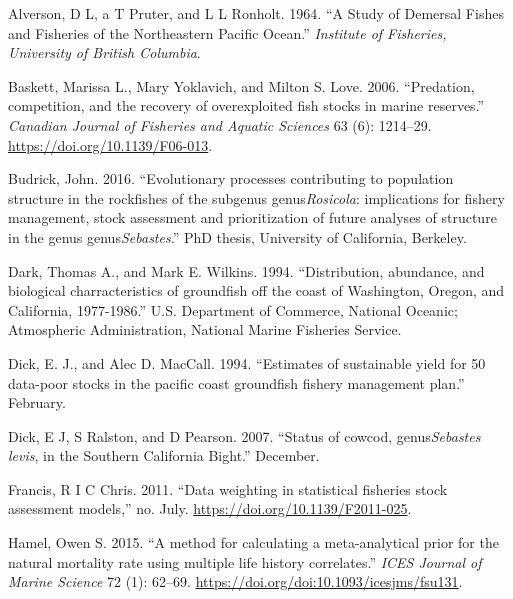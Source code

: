 \documentclass[11pt,
  english,
  a4paper,
]{article}
\newlength{\cslhangindent}
\newenvironment{CSLReferences}[2] %
 {%
  \setlength{\parindent}{0pt}
  \ifodd #1 \everypar{\setlength{\hangindent}{\cslhangindent}}\ignorespaces\fi
  \ifnum #2 > 0
  \setlength{\parskip}{#2\baselineskip}
  \fi
 }%
 {}
\begin{document}
\hypertarget{refs}{}
\begin{CSLReferences}{1}{0}
\leavevmode{}%
Alverson, D L, a T Pruter, and L L Ronholt. 1964. {``{A Study of Demersal Fishes and Fisheries of the Northeastern Pacific Ocean}.''} \emph{Institute of Fisheries, University of British Columbia}.

\leavevmode{}%
Baskett, Marissa L., Mary Yoklavich, and Milton S. Love. 2006. {``{Predation, competition, and the recovery of overexploited fish stocks in marine reserves}.''} \emph{Canadian Journal of Fisheries and Aquatic Sciences} 63 (6): 1214--29. \url{https://doi.org/10.1139/F06-013}.

\leavevmode{}%
Budrick, John. 2016. {``{Evolutionary processes contributing to population structure in the rockfishes of the subgenus genus\emph{Rosicola}: implications for fishery management, stock assessment and prioritization of future analyses of structure in the genus genus\emph{Sebastes}.}''} PhD thesis, University of California, Berkeley.

\leavevmode{}%
Dark, Thomas A., and Mark E. Wilkins. 1994. {``{Distribution, abundance, and biological charracteristics of groundfish off the coast of Washington, Oregon, and California, 1977-1986}.''} U.S. Department of Commerce, National Oceanic; Atmospheric Administration, National Marine Fisheries Service.

\leavevmode{}%
Dick, E. J., and Alec D. MacCall. 1994. {``{Estimates of sustainable yield for 50 data-poor stocks in the pacific coast groundfish fishery management plan}.''} February.

\leavevmode{}%
Dick, E J, S Ralston, and D Pearson. 2007. {``{Status of cowcod, genus\emph{Sebastes levis}, in the Southern California Bight}.''} December.

\leavevmode{}%
Francis, R I C Chris. 2011. {``{Data weighting in statistical fisheries stock assessment models},''} no. July. \url{https://doi.org/10.1139/F2011-025}.

\leavevmode{}%
Hamel, Owen S. 2015. {``{A method for calculating a meta-analytical prior for the natural mortality rate using multiple life history correlates}.''} \emph{ICES Journal of Marine Science} 72 (1): 62--69. \url{https://doi.org/doi:10.1093/icesjms/fsu131}.


\end{CSLReferences}
\end{document}
